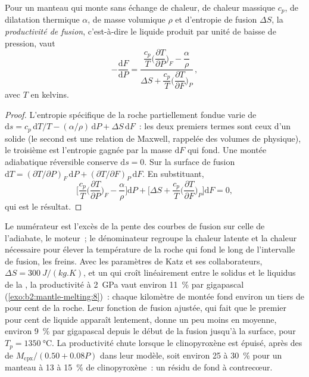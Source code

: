 \begin{proposition}\label{prop:b2:mantle-melting:productivity}
Pour un manteau qui monte sans échange de chaleur, de chaleur massique $c_p$, de dilatation
thermique $\alpha$, de masse volumique $\rho$ et d'entropie de fusion $\Delta S$, la
\emph{productivité de fusion}, c'est-à-dire le liquide produit par unité de
baisse de pression, vaut
\[
  -\frac{\mathrm dF}{\mathrm dP} =
  \frac{\dfrac{c_p}{T}\Big(\dfrac{\partial T}{\partial P}\Big)_F - \dfrac{\alpha}{\rho}}
       {\Delta S + \dfrac{c_p}{T}\Big(\dfrac{\partial T}{\partial F}\Big)_P}\,,
\]
avec $T$ en kelvins.
\end{proposition}

\begin{proof}
L'entropie spécifique de la roche partiellement fondue varie de $\mathrm ds = c_p\,
\mathrm dT/T - (\alpha/\rho)\,\mathrm dP + \Delta S\,\mathrm dF$~: les deux premiers
termes sont ceux d'un solide (le second est une relation de Maxwell, rappelée des
volumes de physique), le troisième est l'entropie gagnée par la masse $\mathrm dF$ qui
fond. Une montée adiabatique réversible conserve $\mathrm ds = 0$. Sur la
surface de fusion $\mathrm dT = (\partial T/\partial P)_F\,\mathrm dP + (\partial
T/\partial F)_P\,\mathrm dF$. En substituant,
\[
  \Big[\frac{c_p}{T}\Big(\frac{\partial T}{\partial P}\Big)_F - \frac{\alpha}{\rho}\Big]\mathrm dP
  + \Big[\Delta S + \frac{c_p}{T}\Big(\frac{\partial T}{\partial F}\Big)_P\Big]\mathrm dF = 0,
\]
qui est le résultat.
\end{proof}

Le numérateur est l'excès de la pente des courbes de fusion sur celle de l'adiabate, le
moteur~; le dénominateur regroupe la chaleur latente et la chaleur nécessaire pour élever la
température de la roche qui fond le long de l'intervalle de fusion, les freins. Avec les
paramètres de Katz et ses collaborateurs, $\Delta S = \qty{300}{J/(kg.K)}$, et un  qui croît linéairement entre le solidus et le liquidus de la , la
productivité à \qty{2}{GPa} vaut environ \qty{11}{\percent} par gigapascal
(\cref{exo:b2:mantle-melting:8})~: chaque kilomètre de montée fond environ un tiers de pour cent de la
roche. Leur fonction de fusion ajustée, qui fait que le premier pour cent de liquide apparaît
lentement, donne un peu moins en moyenne, environ \qty{9}{\percent} par gigapascal
depuis le début de la fusion jusqu'à la surface, pour $T_p = \qty{1350}{\celsius}$. La productivité
chute lorsque le clinopyroxène est épuisé, après des 
de $M_{\mathrm{cpx}}/(0.50 + 0.08P)$ dans leur modèle, soit environ 25 à \qty{30}{\percent} pour
un manteau à 13 à \qty{15}{\percent} de clinopyroxène~: un résidu de  fond
à contrecœur.

